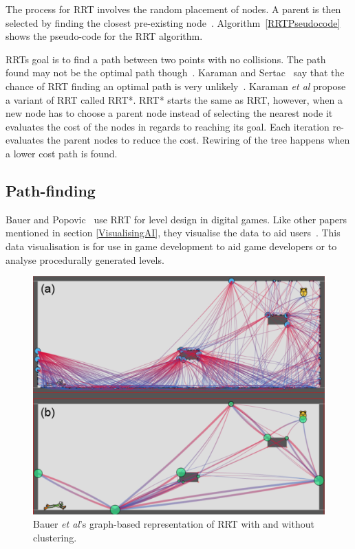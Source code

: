 \documentclass[journal]{IEEEtran}
\begin{document}
	The process for RRT involves the random placement of nodes. A parent is then selected by finding the closest pre-existing node~\cite{Kuffner2000}. Algorithm~\ref{RRTPseudocode} shows the pseudo-code for the RRT algorithm. 
	
	RRTs goal is to find a path between two points with no collisions. The path found may not be the optimal path though~\cite{Kuffner2000, Karaman2011}. Karaman and Sertac~\cite{karaman2010} say that the chance of RRT finding an optimal path is very unlikely~\cite{karaman2010, Tremblay2014}.  Karaman \textit{et al} propose a variant of RRT called RRT*. RRT* starts the same as RRT, however, when a new node has to choose a parent node instead of selecting the nearest node it evaluates the cost of the nodes in regards to reaching its goal. Each iteration re-evaluates the parent nodes to reduce the cost. Rewiring of the tree happens when a lower cost path is found.
	
	\subsection{Path-finding} \label{Pathfinding}
	Bauer and Popovic~\cite{bauer2012} use RRT for level design in digital games. Like other papers mentioned in section \ref{VisualisingAI}, they visualise the data to aid users~\cite{bauer2012, Haworth2010}. This data visualisation is for use in game development to aid game developers or to analyse procedurally generated levels. 
	
	\begin{figure}[h]
		\includegraphics[width=1.0\linewidth]{BauerRRT.png}
		\caption{ Bauer \textit{et al}'s\cite{bauer2012} graph-based representation of RRT with and without clustering.}
		\label{BauerRRT}
	\end{figure} 
	
\end{document}
